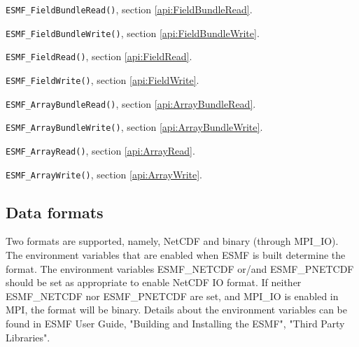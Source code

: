 \begin{description}
\item {\tt ESMF\_FieldBundleRead()}, section \ref{api:FieldBundleRead}.
\item {\tt ESMF\_FieldBundleWrite()}, section \ref{api:FieldBundleWrite}.
\item {\tt ESMF\_FieldRead()}, section \ref{api:FieldRead}.
\item {\tt ESMF\_FieldWrite()}, section \ref{api:FieldWrite}.
\item {\tt ESMF\_ArrayBundleRead()}, section \ref{api:ArrayBundleRead}.
\item {\tt ESMF\_ArrayBundleWrite()}, section \ref{api:ArrayBundleWrite}.
\item {\tt ESMF\_ArrayRead()}, section \ref{api:ArrayRead}.
\item {\tt ESMF\_ArrayWrite()}, section \ref{api:ArrayWrite}.
\end{description}


\subsection{Data formats}

Two formats are supported, namely, NetCDF and binary (through MPI\_IO). 
The environment variables that are enabled when ESMF is built determine the 
format.  The environment variables ESMF\_NETCDF or/and ESMF\_PNETCDF should be 
set as appropriate to enable NetCDF IO format.  If neither ESMF\_NETCDF nor 
ESMF\_PNETCDF are set, and MPI\_IO is enabled in MPI, the format will be 
binary.  Details about the environment variables can be found in ESMF User 
Guide, "Building and Installing the ESMF", "Third Party Libraries".

